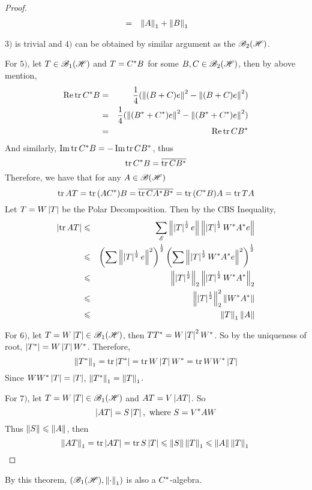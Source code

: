 \documentclass[a4paper,11pt]{report}
\begin{document}
\begin{proof}
\begin{eqnarray*}
		&=& \norm{A}_1 + \norm{B}_1
	\end{eqnarray*}
	\item $3)$ is trivial and $4)$ can be obtained by similar argument as the $\hoper$.
	\item For $5)$, let $T \in \toper$ and $T = \st{C}B$ for some $B,C \in \hoper$, then by above mention,
	\begin{eqnarray*}
		\Rea{\tr{\st{C}B}} &=& \frac{1}{4} (\norm{(B+C)e}^2 - \norm{(B+C)e}^2) \\
		&=& \frac{1}{4} (\norm{(\st{B}+\st{C})e}^2 - \norm{(\st{B}+\st{C})e}^2) \\
		&=& \Rea{\tr{C\st{B}}}
	\end{eqnarray*}
	And similarly, $\Img{\tr{\st{C}B}} = - \Img{\tr{C\st{B}}}$, thus
	\begin{equation*}
		\tr{\st{C}B} = \clo{\tr{C\st{B}}}
	\end{equation*}
	Therefore, we have that for any $A \in \oper$ 
	\begin{equation*}
		\tr{AT} = \tr{(A\st{C})B} = \clo{\tr{C\st{A} \st{B}}} = \tr{(\st{C}B)A} = \tr{TA}
	\end{equation*}
	Let $T = W \abs{T}$ be the Polar Decomposition. Then by the CBS Inequality,
	\begin{eqnarray*}
		\abs{\tr{AT}} &\leqslant& \sum_{\fml{E}}  \norm{\abs{T}^{\frac{1}{2}}e}\norm{\abs{T}^{\frac{1}{2}}\st{W}\st{A}e} \\
		&\leqslant& \left(\sum \norm{\abs{T}^{\frac{1}{2}}e}^2 \right)^{\frac{1}{2}}\left(\sum \norm{\abs{T}^{\frac{1}{2}}\st{W}\st{A}e}^2 \right)^{\frac{1}{2}} \\
		&\leqslant& \norm{\abs{T}^{\frac{1}{2}}}_2\norm{\abs{T}^{\frac{1}{2}}\st{W}\st{A}}_2 \\
		&\leqslant& \norm{\abs{T}^{\frac{1}{2}}}_2^2 \norm{\st{W}\st{A}} \\
		&\leqslant& \norm{T}_1 \norm{A}
	\end{eqnarray*}	
	\item For $6)$, let $T = W \abs{T} \in \toper$, then $T\st{T} = W \abs{T}^2 \st{W}$. So by the uniqueness of root, $\abs{\st{T}} = W \abs{T} \st{W}$. Therefore,
	\begin{equation*}
		\norm{\st{T}}_1 = \tr{\abs{\st{T}}} = \tr{W \abs{T} \st{W}} = \tr{W \st{W} \abs{T}}
	\end{equation*} 
	Since $W \st{W} \abs{T} = \abs{T}$, $\norm{\st{T}}_1 = \norm{T}_1$.
	\item For $7)$, let $T = W \abs{T} \in \toper$ and $AT = V \abs{AT}$. So
	\begin{equation*}
		\abs{AT} = S \abs{T}, \text{ where } S = \st{V}A W
	\end{equation*}
	Thus $\norm{S} \leqslant \norm{A}$, then
	\begin{equation*}
		\norm{AT}_1 = \tr{\abs{AT}} = \tr{S \abs{T}} \leqslant \norm{S} \norm{T}_1 \leqslant \norm{A}\norm{T}_1 \qedhere
	\end{equation*}
\end{proof}
\begin{rem}
	By this theorem, $(\toper, \norm{\cdot}_1)$ is also a $\st{C}$-algebra.
\end{rem}
\end{document}
